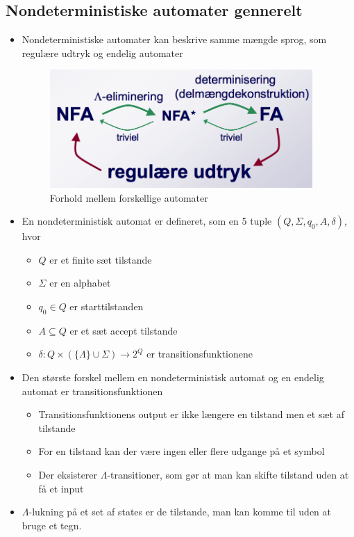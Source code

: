 \documentclass[a4, danish]{article}
\begin{document}
\subsection{Nondeterministiske automater gennerelt}
\begin{itemize}
  \item Nondeterministiske automater kan beskrive samme mængde sprog, som regulære udtryk og endelig automater
  \begin{figure}[h]
	  \centering
	  \includegraphics[width=100mm]{img/automater}
	  \caption{Forhold mellem forskellige automater	\label{automaterNFA}}
  \end{figure}
  \item En nondeterministisk automat er defineret, som en 5 tuple $(Q,\Sigma,q_0,A,\delta)$, hvor
  \begin{itemize}
    \item $Q$ er et finite sæt tilstande
    \item $\Sigma$ er en alphabet
    \item $q_0\in Q$ er starttilstanden
    \item $A \subseteq Q$ er et sæt accept tilstande
    \item $\delta: Q \times(\{ \Lambda \} \cup \Sigma) \rightarrow 2^Q$ er transitionsfunktionene
  \end{itemize}
  \item Den største forskel mellem en nondeterministisk automat og en endelig automat er transitionsfunktionen
  \begin{itemize}
    \item Transitionsfunktionens output er ikke længere en tilstand men et sæt af tilstande 
    \item For en tilstand kan der være ingen eller flere udgange på et symbol
    \item Der eksisterer $\Lambda$-transitioner, som gør at man kan skifte tilstand uden at få et input
  \end{itemize}
  \item $\Lambda$-lukning på et set af states er de tilstande, man kan komme til uden at bruge et tegn.

\end{itemize}
\end{document}
